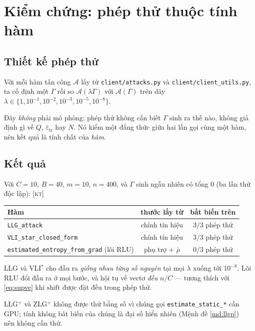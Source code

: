 \documentclass[11pt,a4paper]{article}
\theoremstyle{remark}
\newcommand{\epstr}{\bar\varepsilon_{\mathrm{tr}}}
\newcommand{\code}[1]{\texttt{\small #1}}
\begin{document}
\section{Kiểm chứng: phép thử thuộc tính hàm}
\label{sec:kiemchung}

\subsection{Thiết kế phép thử}

Với mỗi hàm tấn công $\mathcal{A}$ lấy từ \code{client/attacks.py} và
\code{client/client\_utils.py}, ta cố định một $\Gamma$ rồi so
$\mathcal{A}(\lambda\Gamma)$ với $\mathcal{A}(\Gamma)$ trên dãy
$\lambda\in\{1,10^{-1},10^{-2},10^{-3},10^{-5},10^{-8}\}$.

Đây \emph{không} phải mô phỏng: phép thử không cần biết $\Gamma$ sinh ra thế
nào, không giả định gì về $Q$, $\epstr$ hay $N$. Nó kiểm một đẳng thức giữa
hai lần gọi cùng một hàm, nên kết quả là tính chất của \emph{hàm}.

\subsection{Kết quả}

Với $C=10$, $B=40$, $m=10$, $n=400$, và $\Gamma$ sinh ngẫu nhiên có tổng $0$
(ba lần thử độc lập): \textsc{[kt]}

\begin{center}
\begin{tabular}{@{}lcc@{}}
\toprule
\textbf{Hàm} & \textbf{thước lấy từ} & \textbf{bất biến trên} \\
\midrule
\code{LLG\_attack}                   & chính tín hiệu & $3/3$ phép thử \\
\code{VLI\_star\_closed\_form}       & chính tín hiệu & $3/3$ phép thử \\
\code{estimated\_entropy\_from\_grad} (lõi RLU) & phụ trợ $+$ $\bar\rho$ & $0/3$ phép thử \\
\bottomrule
\end{tabular}
\end{center}

LLG và VLI$^*$ cho đầu ra \emph{giống nhau từng số nguyên} tại mọi $\lambda$
xuống tới $10^{-8}$. Lõi RLU đổi đầu ra ở mọi bước, và hội tụ về vectơ
\emph{đều} $n/C$ --- tương thích với \eqref{eq:supve} khi
$\mathrm{shift}$ được đặt đều trong phép thử.

LLG$^+$ và ZLG$^+$ không được thử bằng số vì chúng gọi
\code{estimate\_static\_*} cần GPU; tính không bất biến của chúng là đại số
hiển nhiên (Mệnh đề \ref{md:llgp}) nên không cần thử.
\end{document}
